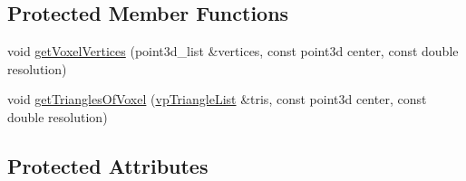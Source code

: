 \subsection*{Protected Member Functions}
\begin{DoxyCompactItemize}
\item 
void \hyperlink{classPMVolumetric_a2eb41f090c07341c0667fd2cb760722a}{get\+Voxel\+Vertices} (point3d\+\_\+list \&vertices, const point3d center, const double resolution)
\item 
void \hyperlink{classPMVolumetric_a9aedd06e356c9fe46e6287a3b2361669}{get\+Triangles\+Of\+Voxel} (\hyperlink{classvpTriangleList}{vp\+Triangle\+List} \&tris, const point3d center, const double resolution)
\end{DoxyCompactItemize}
\subsection*{Protected Attributes}
